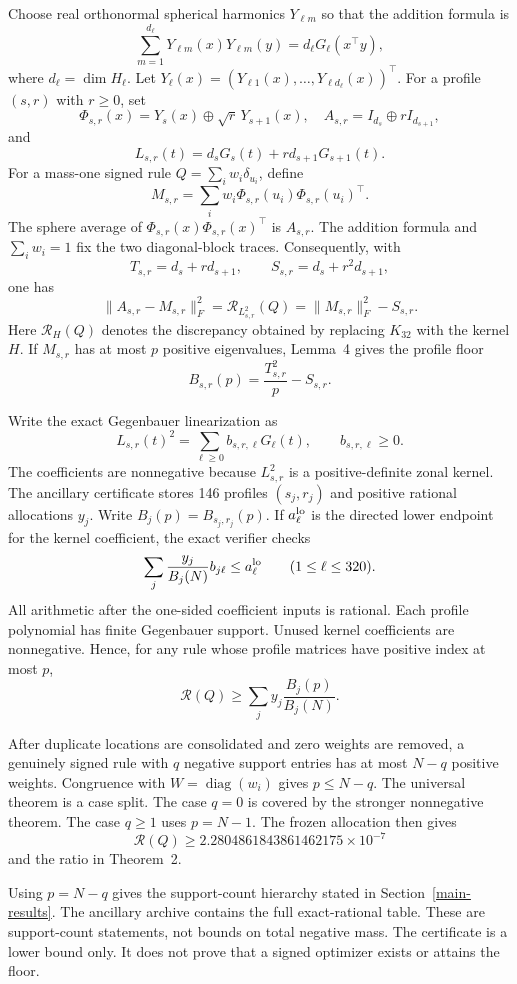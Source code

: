 \documentclass[11pt]{article}
\begin{document}
Choose real orthonormal spherical harmonics $Y_{\ell m}$ so that the
addition formula is
\[
\sum_{m=1}^{d_\ell}Y_{\ell m}(x)Y_{\ell m}(y)
=d_\ell G_\ell(x^\top y),
\]
where $d_\ell=\dim H_\ell$. Let
$Y_\ell(x)=(Y_{\ell1}(x),\ldots,Y_{\ell d_\ell}(x))^\top$. For a
profile $(s,r)$ with $r\ge0$, set
\[
\Phi_{s,r}(x)=Y_s(x)\oplus\sqrt r\,Y_{s+1}(x),
\quad
A_{s,r}=I_{d_s}\oplus rI_{d_{s+1}},
\]
and
\[
L_{s,r}(t)=d_sG_s(t)+r d_{s+1}G_{s+1}(t).
\]
For a mass-one signed rule $Q=\sum_iw_i\delta_{u_i}$, define
\[
M_{s,r}=\sum_iw_i\Phi_{s,r}(u_i)\Phi_{s,r}(u_i)^\top.
\]
The sphere average of $\Phi_{s,r}(x)\Phi_{s,r}(x)^\top$ is
$A_{s,r}$. The addition formula and $\sum_iw_i=1$ fix the two
diagonal-block traces. Consequently, with
\[
T_{s,r}=d_s+r d_{s+1},
\qquad
S_{s,r}=d_s+r^2d_{s+1},
\]
one has
\[
\|A_{s,r}-M_{s,r}\|_F^2
=\mathcal R_{L_{s,r}^2}(Q)
=\|M_{s,r}\|_F^2-S_{s,r}.
\]
Here $\mathcal R_H(Q)$ denotes the discrepancy obtained by replacing
$K_{32}$ with the kernel $H$. If $M_{s,r}$ has at most $p$ positive
eigenvalues, Lemma~4 gives the
profile floor
\[
B_{s,r}(p)=\frac{T_{s,r}^2}{p}-S_{s,r}.
\]

Write the exact Gegenbauer linearization as
\[
L_{s,r}(t)^2=\sum_{\ell\ge0}b_{s,r,\ell}G_\ell(t),
\qquad b_{s,r,\ell}\ge0.
\]
The coefficients are nonnegative because $L_{s,r}^2$ is a positive-definite
zonal kernel.
The ancillary certificate stores 146 profiles $(s_j,r_j)$ and positive
rational allocations $y_j$. Write $B_j(p)=B_{s_j,r_j}(p)$. If
$a_\ell^{\rm lo}$ is the directed lower endpoint for the kernel coefficient,
the exact verifier checks
\[
\sum_j\frac{y_j}{B_j(N)}b_{j\ell}
\le a_\ell^{\rm lo}
\qquad(1\le\ell\le320).
\]
All arithmetic after the one-sided coefficient inputs is rational. Each
profile polynomial has finite Gegenbauer support. Unused kernel coefficients
are nonnegative. Hence, for any rule whose profile matrices have positive
index at most $p$,
\[
\mathcal R(Q)
\ge
\sum_j y_j\frac{B_j(p)}{B_j(N)}.
\]

After duplicate locations are consolidated and zero weights are removed, a
genuinely signed rule with $q$ negative support entries has at most $N-q$
positive weights. Congruence with $W=\operatorname{diag}(w_i)$ gives
$p\le N-q$. The universal theorem is a case split. The case $q=0$ is
covered by the stronger nonnegative theorem. The case $q\ge1$ uses
$p=N-1$. The frozen allocation then gives
\[
\mathcal R(Q)\ge2.2804861843861462175\times10^{-7}
\]
and the ratio in Theorem~2.

Using $p=N-q$ gives the support-count hierarchy stated in
Section~\ref{main-results}. The ancillary archive contains the full
exact-rational table. These are support-count statements, not bounds on
total negative mass. The certificate is a lower bound only. It does not
prove that a signed optimizer exists or attains the floor.
\end{document}
